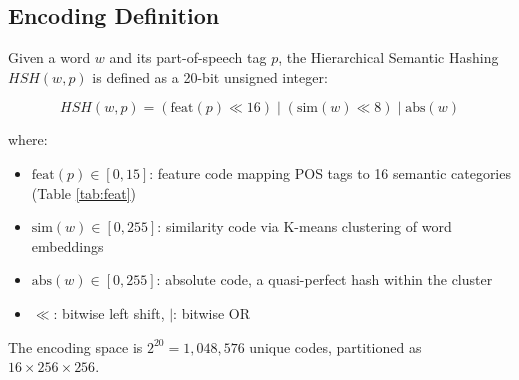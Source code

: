 \documentclass[11pt,a4paper]{article}
\theoremstyle{definition}
\begin{document}
\subsection{Encoding Definition}
\label{sec:encoding}

Given a word $w$ and its part-of-speech tag $p$, the Hierarchical Semantic Hashing $HSH(w, p)$ is defined as a 20-bit unsigned integer:

\begin{equation}
HSH(w, p) = (\text{feat}(p) \ll 16) \;|\; (\text{sim}(w) \ll 8) \;|\; \text{abs}(w)
\label{eq:hsh}
\end{equation}

where:
\begin{itemize}
    \item $\text{feat}(p) \in [0, 15]$: feature code mapping POS tags to 16 semantic categories (Table \ref{tab:feat})
    \item $\text{sim}(w) \in [0, 255]$: similarity code via K-means clustering of word embeddings
    \item $\text{abs}(w) \in [0, 255]$: absolute code, a quasi-perfect hash within the cluster
    \item $\ll$: bitwise left shift, $|$: bitwise OR
\end{itemize}

The encoding space is $2^{20} = 1,048,576$ unique codes, partitioned as $16 \times 256 \times 256$.
\end{document}
